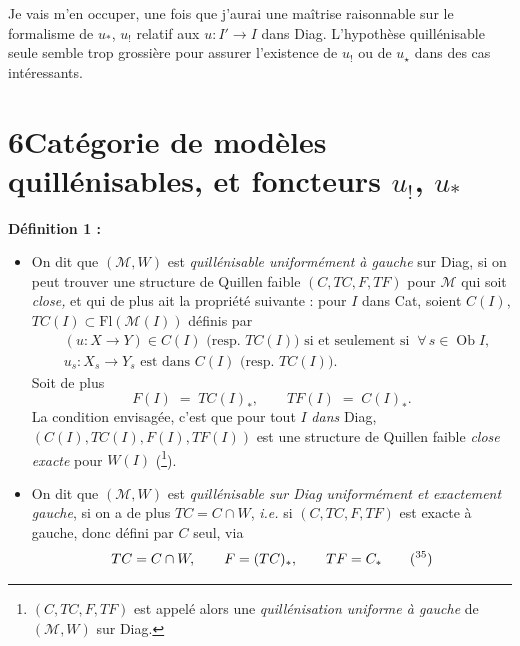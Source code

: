 Je vais m'en occuper, une fois que j'aurai une maîtrise raisonnable sur le formalisme de $u_{*}$, $u_{!}$ relatif aux $u : I' \longrightarrow I$ dans Diag. L'hypothèse quillénisable seule semble trop grossière pour assurer l'existence de $u_{!}$ ou de $u_{\star}$ dans des cas intéressants. %

\noindent{}

\section*{6\quad Catégorie de modèles quillénisables, et foncteurs $u_{!}$, $u_{*}$}

\textbf{Définition 1 :}

\begin{itemize}[leftmargin=2.5em]
\item[\circled{a}] On dit que $(\mathcal{M},W)$ est \textit{quillénisable uniformément à gauche} sur Diag, si on peut trouver une structure de Quillen faible $(C,TC,F,TF)$ pour $\mathcal{M}$ qui soit \textit{close,} et qui de plus ait la propriété suivante : pour $I$ dans Cat, soient $C(I)$, $TC(I) \subset \mathrm{Fl}(\mathcal{M}(I))$ définis par
\[ \begin{aligned} &(u : X \longrightarrow Y) \in C(I) \text{ (resp. } TC(I)) \text{ si et seulement si } \ \forall\, s \in \operatorname{Ob} I, \\ &u_{s} : X_{s} \longrightarrow Y_{s} \text{ est dans } C(I) \text{ (resp. } TC(I)). \end{aligned} \]
Soit de plus
\[ F(I) \;=\; TC(I)_{*}, \qquad TF(I) \;=\; C(I)_{*}. \]
La condition envisagée, c'est que pour tout $I$ \textit{dans} Diag, $(C(I),TC(I),F(I),TF(I))$ est une structure de Quillen faible \textit{close exacte} pour $W(I)$ (\footnote[34]{$(C,TC,F,TF)$ est appelé alors une \textit{quillénisation uniforme à gauche} de $(\mathcal{M},W)$ sur Diag.}).

\item[\circled{b}] On dit que $(\mathcal{M},W)$ est \textit{quillénisable sur Diag uniformément et exactement} \textit{gauche}, si on a de plus $TC = C \cap W$, \textit{i.e.} si $(C,TC,F,TF)$ est exacte à gauche, donc défini par $C$ seul, via
\[ TC = C \cap W, \qquad F = (TC)_{*}, \qquad TF = C_{*} \qquad \text{(\footnotemark[35])} \]
\end{itemize}

